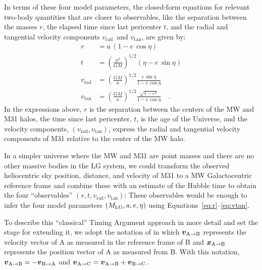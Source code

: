 \documentclass[twocolumn]{aastex631}
\newcommand{\mlg}{\ensuremath{M_{\rm LG}}}
\newcommand{\vtan}{\ensuremath{v_\textrm{tan}}}
\newcommand{\vrad}{\ensuremath{v_\textrm{rad}}}
\newcommand{\bov}{\ensuremath{\boldsymbol{v}}}
\newcommand{\boldx}{\ensuremath{\boldsymbol{x}}}
\newcommand{\pos}[2]{\ensuremath{\boldx_{\rm #1 \to #2}}}
\newcommand{\vel}[2]{\ensuremath{\bov_{\rm #1 \to #2}}}
\begin{document}
In terms of these four model parameters, the closed-form equations for relevant
two-body quantities that are closer to observables, like the separation between
the masses $r$, the elapsed time since last pericenter $t$, and the radial and
tangential velocity components \vrad\ and \vtan, are given by:
\begin{align}
  r &= a \, (1-e\,\cos\eta) \label{eq:r} \\
  t &= \left( \frac{a^3}{GM} \right)^{1/2}(\eta-e\,\sin\eta) \label{eq:t} \\
  \vrad &= \left( \frac{GM}{a} \right)^{1/2} \frac{e\,\sin\eta}{1-e\,\cos\eta}
  \label{eq:vrad} \\
  \vtan &= \left( \frac{GM}{a} \right)^{1/2} \frac{\sqrt{1-e^2}}{1-e\,\cos\eta}
  \label{eq:vtan} \quad .
\end{align}
In the expressions above, $r$ is the separation between the centers of the MW
and M31 halos, the time since last pericenter, $t$, is the age of the Universe,
and the velocity components, $(\vrad, \vtan)$, express the radial and tangential
velocity components of M31 relative to the center of the MW halo.

In a simpler universe where the MW and M31 are point masses and there are no
other massive bodies in the LG system, we could transform the observed
heliocentric sky position, distance, and velocity of M31 to a MW Galactocentric
reference frame and combine these with an estimate of the Hubble time to obtain
the four ``observables'' $(r, t, \vrad, \vtan)$:
These observables would be enough to infer the four model parameters $(\mlg, a,
e, \eta)$ using Equations~\ref{eq:r}--\ref{eq:vtan}.

To describe this ``classical'' Timing Argument approach in more detail and set
the stage for extending it, we adopt the notation of \citet{Penarrubia2016} in
which $\vel{A}{B}$ represents the velocity vector of A as measured in
the reference frame of B and $\pos{A}{B}$ represents the position vector of A as
measured from B.
With this notation, $\vel{A}{B} = -\vel{B}{A}$ and $\vel{A}{C} = \vel{A}{B} +
\vel{B}{C}$.
\end{document}
